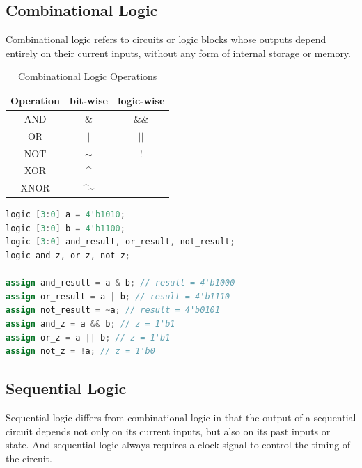 \documentclass{article}
\begin{document}
\subsection{Combinational Logic}
Combinational logic refers to circuits or logic blocks whose outputs depend entirely on their current inputs, without any form of internal storage or memory.
\begin{table}[h]
    \centering
    \begin{tabular}{|c|c|c|}
        \hline
        \textbf{Operation} & \textbf{bit-wise} & \textbf{logic-wise} \\
        \hline
        AND & \& & \&\& \\
        OR & $|$ & $||$ \\
        NOT & $\sim$ & $!$ \\
        XOR & \^{} &  \\
        XNOR & \^{}\textasciitilde &  \\
        \hline
    \end{tabular}
    \caption{Combinational Logic Operations}
\end{table}
\begin{lstlisting}[language=Verilog,frame=single,backgroundcolor=\color{White},basicstyle=\color{LightGreen},showspaces=false,showstringspaces=false]
logic [3:0] a = 4'b1010;
logic [3:0] b = 4'b1100;
logic [3:0] and_result, or_result, not_result;
logic and_z, or_z, not_z;

assign and_result = a & b; // result = 4'b1000
assign or_result = a | b; // result = 4'b1110
assign not_result = ~a; // result = 4'b0101
assign and_z = a && b; // z = 1'b1
assign or_z = a || b; // z = 1'b1
assign not_z = !a; // z = 1'b0
\end{lstlisting}

\subsection{Sequential Logic}
Sequential logic differs from combinational logic in that the output of a sequential circuit depends not only on its current inputs, but also on its past inputs or state. And sequential logic always requires a clock signal to control the timing of the circuit.
\end{document}
